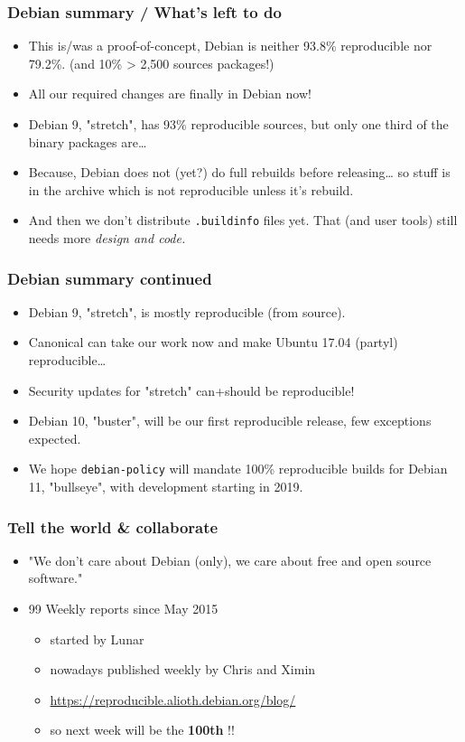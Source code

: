 \documentclass[14pt,aspectratio=169]{beamer}
\begin{document}
\begin{frame}
 \frametitle{Debian summary / What's left to do}
 \begin{itemize}
  \item This is/was a proof-of-concept, Debian is neither 93.8\% reproducible nor
  79.2\%. (and 10\% > 2,500 sources packages!)
  \item<2-3> All our required changes are finally in Debian now!
  \item<2-3> Debian 9, "stretch", has 93\% reproducible sources, but only one third of the binary packages are…
  \item<2-3> Because, Debian does not (yet?) do full rebuilds before
  releasing… so stuff is in the archive which is not reproducible unless it's
  rebuild.
  \item<3> And then we don't distribute \texttt{.buildinfo} files yet.
   That (and user tools) still needs more \it{design} and code.
 \end{itemize}
\end{frame}


\begin{frame}
 \frametitle{Debian summary continued}
 \begin{itemize}
  \item Debian 9, "stretch", is mostly reproducible (from source).
  \item Canonical can take our work now and make Ubuntu 17.04
  (partyl) reproducible…
  \item<2-4> Security updates for "stretch" can+should be reproducible!
  \item<3-4> Debian 10, "buster", will be our first reproducible release, few exceptions expected.
  \item<4> We hope \texttt{debian-policy} will mandate 100\%
  reproducible builds for Debian 11, "bullseye", with development starting in 2019.
 \end{itemize}
\end{frame}

\begin{frame}
 \frametitle{Tell the world \& collaborate}

 \begin{itemize}
  \item "We don't care about Debian (only), we care about free and open
   source software."
  \item<2-3> 99 Weekly reports since May 2015
   \begin{itemize}
    \item started by Lunar
    \item nowadays published weekly by Chris and Ximin
    \item \url{https://reproducible.alioth.debian.org/blog/}
  \item<3> so next week will be the \textbf{100th} !!
   \end{itemize}
    \end{itemize}
\end{frame}
\end{document}
